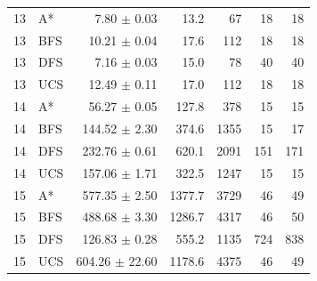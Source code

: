 \begin{longtable}{@{}c l r r r r r@{}}
13 & A* & 7.80 $\pm$ 0.03 & 13.2 & 67 & 18 & 18 \\
13 & BFS & 10.21 $\pm$ 0.04 & 17.6 & 112 & 18 & 18 \\
13 & DFS & 7.16 $\pm$ 0.03 & 15.0 & 78 & 40 & 40 \\
13 & UCS & 12.49 $\pm$ 0.11 & 17.0 & 112 & 18 & 18 \\
14 & A* & 56.27 $\pm$ 0.05 & 127.8 & 378 & 15 & 15 \\
14 & BFS & 144.52 $\pm$ 2.30 & 374.6 & 1355 & 15 & 17 \\
14 & DFS & 232.76 $\pm$ 0.61 & 620.1 & 2091 & 151 & 171 \\
14 & UCS & 157.06 $\pm$ 1.71 & 322.5 & 1247 & 15 & 15 \\
15 & A* & 577.35 $\pm$ 2.50 & 1377.7 & 3729 & 46 & 49 \\
15 & BFS & 488.68 $\pm$ 3.30 & 1286.7 & 4317 & 46 & 50 \\
15 & DFS & 126.83 $\pm$ 0.28 & 555.2 & 1135 & 724 & 838 \\
15 & UCS & 604.26 $\pm$ 22.60 & 1178.6 & 4375 & 46 & 49 \\
\end{longtable}
\endgroup
